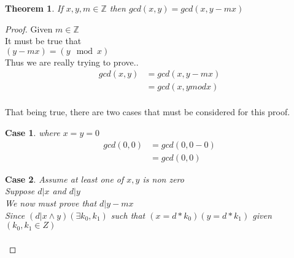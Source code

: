 \documentclass[11pt,a4paper]{book}
\theoremstyle{plain}
\newtheorem{thm}{Theorem}
\newtheorem{case}{Case}
\theoremstyle{nonumberplain}
\newtheorem{proof}{Proof}
\begin{document}
\begin{thm}
If $x,y,m \in \mathbb{Z}$ then $gcd(x,y) = gcd(x,y-mx)$
\end{thm}
\begin{proof}
Given $m \in \mathbb{Z}$\\ 
It must be true that\\
$(y-mx) = (y\mod x)$\\
Thus we are really trying to prove.. \\
\begin{align*}
gcd(x,y) &= gcd(x,y-mx)\\
&= gcd(x,y mod x)\\ 
\end{align*}

That being true, there are two cases that must be considered for this proof.
\begin{case}
where $x=y=0$\\
\begin{align*}
gcd(0,0) &= gcd(0,0-0)\\
&= gcd(0,0)
\end{align*}
\end{case}


\begin{case}
Assume at least one of $x,y$ is non zero\\
Suppose $d|x$ and $d|y$\\
We now must prove that $d|y-mx$\\
Since $(d|x \wedge y)(\exists k_0,k_1)$ such that $(x = d*k_0)(y = d*k_1)$ given $(k_0,k_1 \in Z)$
\begin{align*} 
\end{align*}
\end{case}
\end{proof}
\end{document}
